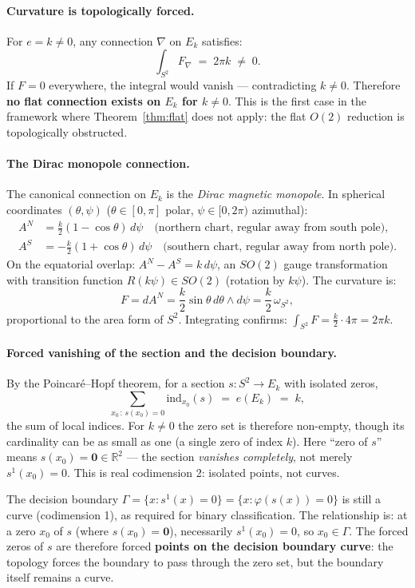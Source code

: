 \documentclass[11pt, a4paper]{article}
\theoremstyle{plain}
\theoremstyle{definition}
\newcommand{\R}{\mathbb{R}}
\newcommand{\Gam}{\Gamma}
\begin{document}
\paragraph{Curvature is topologically forced.}
For $e = k \neq 0$, any connection $\nabla$ on $E_k$ satisfies:
\[
  \int_{S^2} F_\nabla \;=\; 2\pi k \;\neq\; 0.
\]
If $F = 0$ everywhere, the integral would vanish --- contradicting $k \neq 0$.
Therefore \textbf{no flat connection exists on $E_k$ for $k \neq 0$}.
This is the first case in the framework where Theorem~\ref{thm:flat} does not
apply: the flat $O(2)$ reduction is topologically obstructed.

\paragraph{The Dirac monopole connection.}
The canonical connection on $E_k$ is the \emph{Dirac magnetic monopole}. In
spherical coordinates $(\theta, \psi)$ ($\theta \in [0,\pi]$ polar,
$\psi \in [0,2\pi)$ azimuthal):
\begin{align*}
  A^N &= \frac{k}{2}(1-\cos\theta)\,d\psi \quad
  \text{(northern chart, regular away from south pole)}, \\
  A^S &= -\frac{k}{2}(1+\cos\theta)\,d\psi \quad
  \text{(southern chart, regular away from north pole)}.
\end{align*}
On the equatorial overlap: $A^N - A^S = k\,d\psi$, an $SO(2)$ gauge
transformation with transition function $R(k\psi) \in SO(2)$ (rotation by $k\psi$).
The curvature is:
\[
  F = dA^N = \frac{k}{2}\sin\theta\,d\theta\wedge d\psi
    = \frac{k}{2}\,\omega_{S^2},
\]
proportional to the area form of $S^2$. Integrating confirms:
$\int_{S^2} F = \frac{k}{2}\cdot 4\pi = 2\pi k$.

\paragraph{Forced vanishing of the section and the decision boundary.}
By the Poincaré--Hopf theorem, for a section $s: S^2 \to E_k$ with isolated
zeros,
\[
  \sum_{x_0 \,:\, s(x_0)=0} \mathrm{ind}_{x_0}(s) \;=\; e(E_k) \;=\; k ,
\]
the sum of local indices. For $k \neq 0$ the zero set is therefore non-empty,
though its cardinality can be as small as one (a single zero of index $k$).
Here ``zero of $s$'' means $s(x_0) = \mathbf{0} \in \R^2$ --- the section
\emph{vanishes completely}, not merely $s^1(x_0) = 0$. This is real
codimension 2: isolated points, not curves.

The decision boundary $\Gam = \{x : s^1(x) = 0\} = \{x : \varphi(s(x)) = 0\}$
is still a curve (codimension 1), as required for binary classification.
The relationship is: at a zero $x_0$ of $s$ (where $s(x_0) = \mathbf{0}$),
necessarily $s^1(x_0) = 0$, so $x_0 \in \Gam$. The forced zeros of $s$ are
therefore forced \textbf{points on the decision boundary curve}: the topology
forces the boundary to pass through the zero set, but the boundary itself
remains a curve.
\end{document}
